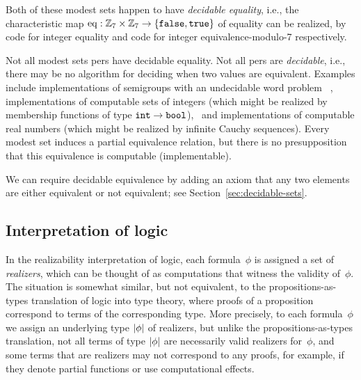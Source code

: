 Both of these modest sets happen to have \emph{decidable equality},
i.e., the characteristic map $\mathrm{eq} : \mathbb{Z}_7 \times
\mathbb{Z}_7 \to \{\mathtt{false}, \mathtt{true}\}$ of equality can be 
realized, by code for integer equality and code for integer equivalence-modulo-7
respectively.
\fi %

\iflong
Not all modest sets pers have decidable equality.
\else
Not all pers are \emph{decidable}, i.e., there may be no algorithm for deciding
when two values are equivalent.
\fi
%
Examples include implementations of semigroups with an undecidable
word problem~\cite{post47:_recur_unsol_probl_thue}%
\iflong, implementations of computable sets of integers (which might
be realized by membership functions of type $\mathtt{int}\to\mathtt{bool}$),\fi
\ and implementations of computable real numbers (which might be
realized by infinite Cauchy sequences).
%
\iflong
%
Every modest set induces a partial
equivalence relation, but there is no presupposition that this
equivalence is computable (implementable).
\fi %

\iflong
We can require decidable equivalence by adding an axiom that any two
elements are either equivalent or not equivalent; see
Section~\ref{sec:decidable-sets}.
\fi

\subsection{Interpretation of logic}
\label{sec:interpretation-logic}

In the realizability interpretation of logic, each formula~$\phi$ is
assigned a set of \emph{realizers}, which can be thought of as
computations that witness the validity of~$\phi$. The situation is
somewhat similar, but not equivalent, to the propositions-as-types
translation of logic into type theory, where proofs of a
proposition correspond to terms of the corresponding type. More
precisely, to each formula~$\phi$ we assign an underlying type
$|\phi|$ of realizers, but unlike the propositions-as-types
translation, not all terms of type $|\phi|$ are necessarily
valid realizers for~$\phi$, and some terms that are realizers may not
correspond to any proofs, for example, if they denote partial
functions or use computational effects.


